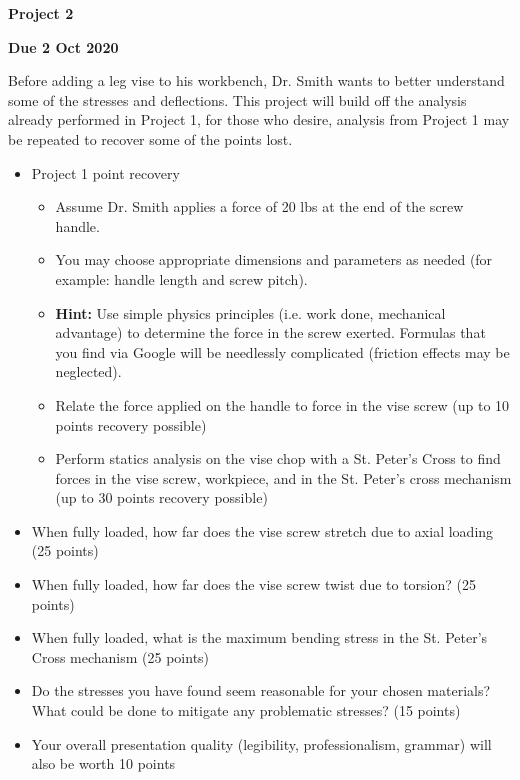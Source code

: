 \documentclass[12pt, oneside]{article}
\begin{document}
\begin{center}
\textbf{\Large Project 2}

\textbf{Due 2 Oct 2020}
\end{center}

Before adding a leg vise to his workbench, Dr. Smith wants to better understand some of the stresses and deflections.
This project will build off the analysis already performed in Project 1, for those who desire, analysis from Project 1 may be repeated to recover some of the points lost.
\begin{itemize}
	\item Project 1 point recovery
		\begin{itemize}
			\item Assume Dr. Smith applies a force of 20 lbs at the end of the screw handle.
			\item You may choose appropriate dimensions and parameters as needed (for example: handle length and screw pitch). 
			\item \textbf{Hint:} Use simple physics principles (i.e. work done, mechanical advantage) to determine the force in the screw exerted. Formulas that you find via Google will be needlessly complicated (friction effects may be neglected).
			\item Relate the force applied on the handle to force in the vise screw (up to 10 points recovery possible) 
			\item Perform statics analysis on the vise chop with a St. Peter's Cross to find forces in the vise screw, workpiece, and in the St. Peter's cross mechanism (up to 30 points recovery possible)
		\end{itemize}
	\item When fully loaded, how far does the vise screw stretch due to axial loading (25 points)
	\item When fully loaded, how far does the vise screw twist due to torsion? (25 points)
	\item When fully loaded, what is the maximum bending stress in the St. Peter's Cross mechanism (25 points)
	\item Do the stresses you have found seem reasonable for your chosen materials? What could be done to mitigate any problematic stresses? (15 points)
	\item Your overall presentation quality (legibility, professionalism, grammar) will also be worth 10 points
\end{itemize}
\end{document}

